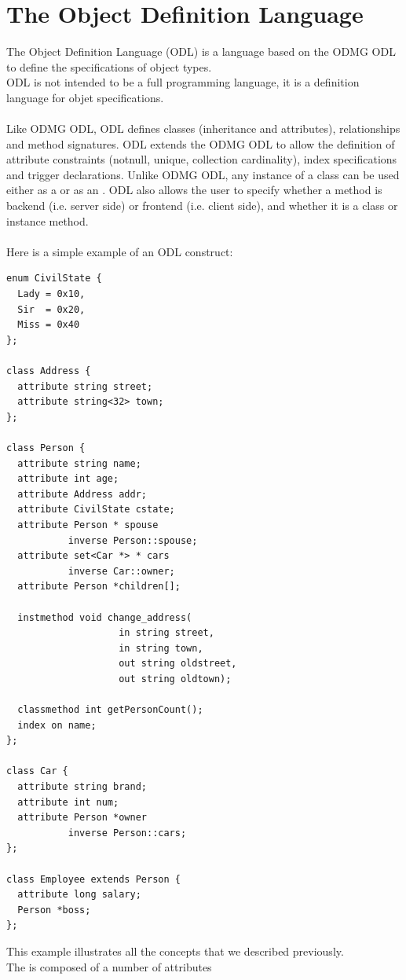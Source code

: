 \section{The Object Definition Language}
The \eyedb Object Definition Language (ODL) is a language
based on the ODMG ODL to define the specifications of object types.
\\
ODL is not intended to be a full programming language, it is a definition
language for objet specifications.
\\
\\
Like ODMG ODL, \eyedb ODL defines classes (inheritance and
attributes), relationships and method signatures.
\eyedb ODL extends the ODMG ODL to allow the definition of
attribute constraints (notnull, unique, collection cardinality), index
specifications and trigger declarations. Unlike ODMG ODL, any instance
of a class can be used either as a  or as
an . \eyedb ODL also allows the user to specify whether a method
is backend (i.e. server side) or frontend (i.e. client side),
and whether it is a class or instance method.
\\
\\
Here is a simple example of an \eyedb ODL construct:
{\verbsize
\begin{verbatim}
enum CivilState {
  Lady = 0x10,
  Sir  = 0x20,
  Miss = 0x40
};

class Address {
  attribute string street;
  attribute string<32> town;
};

class Person {
  attribute string name;
  attribute int age;
  attribute Address addr;
  attribute CivilState cstate;
  attribute Person * spouse
           inverse Person::spouse;
  attribute set<Car *> * cars
           inverse Car::owner;
  attribute Person *children[];

  instmethod void change_address(
                    in string street,
                    in string town,
                    out string oldstreet,
                    out string oldtown);

  classmethod int getPersonCount();
  index on name;
};

class Car {
  attribute string brand;
  attribute int num;
  attribute Person *owner
           inverse Person::cars;
};

class Employee extends Person {
  attribute long salary;
  Person *boss;
};
\end{verbatim}
}
This example illustrates all the concepts that we described
previously.
\\
The  is composed of a number of attributes
